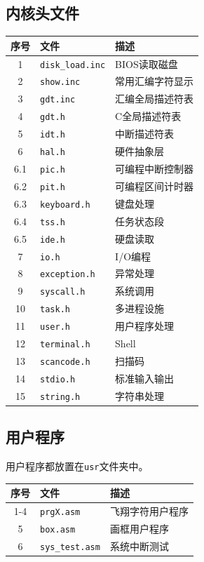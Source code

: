 \documentclass[logo,reportComp]{thesis}
\begin{document}
\subsection{内核头文件}
\begin{center}
\begin{tabular}{|c|l|l|}\hline
\textbf{序号} & \textbf{文件} & \textbf{描述} \\\hline
1 & \verb'disk_load.inc' & BIOS读取磁盘\\\hline
2 & \verb'show.inc' & 常用汇编字符显示\\\hline
3 & \verb'gdt.inc' & 汇编全局描述符表\\\hline
4 & \verb'gdt.h' & C全局描述符表\\\hline
5 & \verb'idt.h' & 中断描述符表\\\hline
6 & \verb'hal.h' & 硬件抽象层\\\hline
6.1 & \verb'pic.h' & 可编程中断控制器\\\hline
6.2 & \verb'pit.h' & 可编程区间计时器\\\hline
6.3 & \verb'keyboard.h' & 键盘处理\\\hline
6.4 & \verb'tss.h' & 任务状态段\\\hline
6.5 & \verb'ide.h' & 硬盘读取\\\hline
7 & \verb'io.h' & I/O编程\\\hline
8 & \verb'exception.h' & 异常处理\\\hline
9 & \verb'syscall.h' & 系统调用\\\hline
10 & \verb'task.h' & 多进程设施\\\hline
11 & \verb'user.h' & 用户程序处理\\\hline
12 & \verb'terminal.h' & Shell\\\hline
13 & \verb'scancode.h' & 扫描码\\\hline
14 & \verb'stdio.h' & 标准输入输出\\\hline
15 & \verb'string.h' & 字符串处理\\\hline
\end{tabular}
\end{center}

\subsection{用户程序}
用户程序都放置在\verb'usr'文件夹中。
\begin{center}
\begin{tabular}{|c|l|l|}\hline
\textbf{序号} & \textbf{文件} & \textbf{描述} \\\hline
1-4 & \verb'prgX.asm' & 飞翔字符用户程序\\\hline
5 & \verb'box.asm' & 画框用户程序\\\hline
6 & \verb'sys_test.asm' & 系统中断测试\\\hline
\end{tabular}
\end{center}
\end{document}
